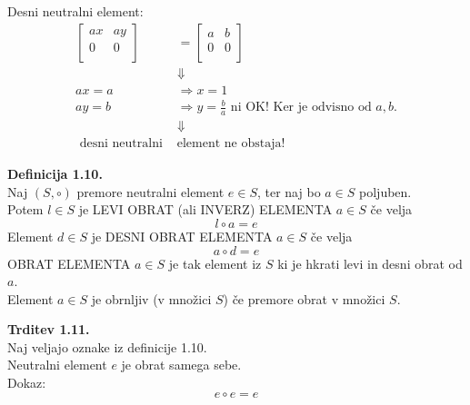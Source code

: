 \documentclass[12pt]{article}
\begin{document}
\noindent
\hspace*{1em} Desni neutralni element: \\

\begin{align*}
    \begin{bmatrix}
        ax & ay \\
        0 & 0 \\
    \end{bmatrix}
    &= 
    \begin{bmatrix}
        a & b \\
        0 & 0 \\
    \end{bmatrix} \\
    & \Downarrow \\
    ax = a & \Rightarrow x = 1 \\
    ay = b & \Rightarrow y = \frac{b}{a} \text{ ni OK! Ker je odvisno od } a, b. \\
    & \Downarrow \\
    \text{ desni neutralni } & \text{element ne obstaja!}
\end{align*}



\vspace*{24pt}


\noindent
\textbf{Definicija 1.10.} \\
Naj $(S, \circ)$ premore neutralni element $e \in S$, ter naj bo $a \in S$ poljuben. \\
Potem $l \in S$ je LEVI OBRAT (ali INVERZ) ELEMENTA $a \in S$ če velja \\
$$l \circ a = e$$
Element $d \in S$ je DESNI OBRAT ELEMENTA $a \in S$ če velja \\
$$a \circ d = e$$
OBRAT ELEMENTA $a \in S$ je tak element iz $S$ ki je hkrati levi in desni obrat od $a$. \\

\noindent
Element $a \in S$ je obrnljiv (v množici $S$) če premore obrat v množici $S$. \\



\vspace*{24pt}


\noindent
\textbf{Trditev 1.11.} \\
Naj veljajo oznake iz definicije 1.10. \\
Neutralni element $e$ je obrat samega sebe. \\
Dokaz:
$$e \circ e = e$$
\end{document}
